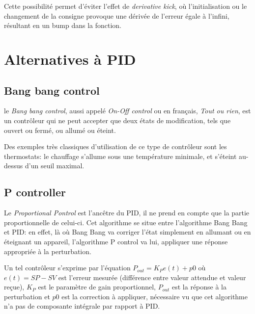 Cette possibilité permet d'éviter l'effet de \emph{derivative kick}, où l'initialisation ou le changement de la consigne provoque une dérivée de l'erreur égale à l'infini, résultant en un bump dans la fonction.




\section{Alternatives à PID}

\subsection{Bang bang control}
le \emph{Bang bang control}, aussi appelé \emph{On-Off control} ou en français, \emph{Tout ou rien}, est un contrôleur qui ne peut accepter que deux états de modification, tels que ouvert ou fermé, ou allumé ou éteint.

Des exemples très classiques d'utilisation de ce type de contrôleur sont les thermostats: le chauffage s'allume sous une température minimale, et s'éteint au-dessus d'un seuil maximal.

\subsection{P controller}
Le \emph{Proportional Pontrol} est l'ancêtre du PID, il ne prend en compte que la partie proportionnelle de celui-ci. Cet algorithme se situe entre l'algorithme Bang Bang et PID: en effet, là où Bang Bang va corriger l'état simplement en allumant ou en éteignant un appareil, l'algorithme P control va lui, appliquer une réponse appropriée à la perturbation.

Un tel contrôleur s'exprime par l'équation $P_{out} = K_{P}e(t) + p0$ où $e(t) = SP - SV$ est l'erreur mesurée (différence entre valeur attendue et valeur reçue), $K_{P}$ est le paramètre de gain proportionnel, $P_{out}$ est la réponse à la perturbation et $p0$ est la correction à appliquer, nécessaire vu que cet algorithme n'a pas de composante intégrale par rapport à PID.

